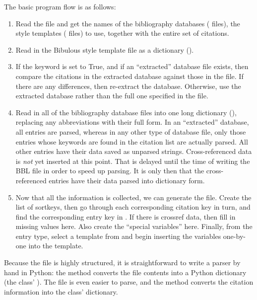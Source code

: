 \documentclass[letterpaper,10pt,english]{sphinxmanual}
\begin{document}
The basic program flow is as follows:
\begin{enumerate}
\item {} 
Read the  file and get the names of the bibliography databases ( files), the style templates ( files) to use, together with the entire set of citations.

\item {} 
Read in the Bibulous style template file as a dictionary ().

\item {} 
If the  keyword is set to True, and if an ``extracted'' database file exists, then compare the citations in the extracted database against those in the  file. If there are any differences, then re-extract the database. Otherwise, use the extracted database rather than the full one specified in the  file.

\item {} 
Read in all of the bibliography database files into one long dictionary (), replacing any abbreviations with their full form. In an ``extracted'' database, all entries are parsed, whereas in any other type of database file, only those entries whose keywords are found in the citation list are actually parsed. All other entries have their data saved as unparsed strings. Cross-referenced data is \emph{not} yet inserted at this point. That is delayed until the time of writing the BBL file in order to speed up parsing. It is only then that the cross-referenced entries have their data parsed into dictionary form.

\item {} 
Now that all the information is collected, we can generate the  file. Create the list of sortkeys, then go through each corresponding citation key in turn, and find the corresponding entry key in . If there is crossref data, then fill in missing values here. Also create the ``special variables'' here. Finally, from the entry type, select a template from  and begin inserting the variables one-by-one into the template.

\end{enumerate}

Because the  file is highly structured, it is straightforward to write a parser by hand in Python: the  method converts the  file contents into a Python dictionary (the  class' ). The  file is even easier to parse, and the  method converts the citation information into the  class'  dictionary.
\end{document}
